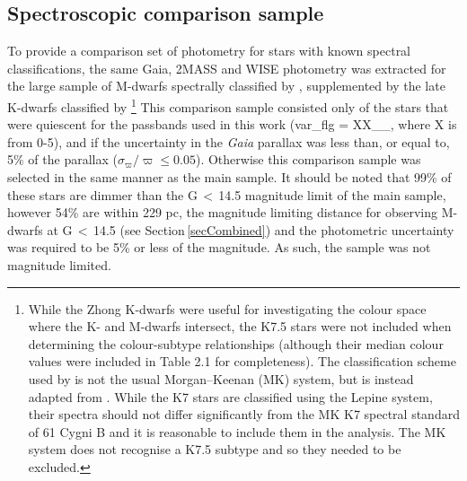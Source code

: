 \subsection{Spectroscopic comparison sample}
\label{secSpecData}
To provide a comparison set of photometry for stars with known spectral classifications, the same Gaia, 2MASS and WISE photometry was extracted for the large sample of M-dwarfs spectrally classified by \cite{2011West}, supplemented by the late K-dwarfs classified by \cite{2015Zhong}\footnote{While the Zhong K-dwarfs were useful for investigating the colour space where the K- and M-dwarfs intersect, the K7.5 stars were not included when determining the colour-subtype relationships (although their median colour values were included in Table 2.1 for completeness). The classification scheme used by \citealt{2015Zhong} is not the usual  Morgan–Keenan (MK) system, but is instead adapted from \citealt{2003Lepine}. While the K7 stars are classified using the Lepine system, their spectra should not differ significantly from the MK K7 spectral standard of 61 Cygni B and it is reasonable to include them in the analysis. The MK system does not recognise a K7.5 subtype and so they needed to be excluded.} This comparison sample consisted only of the stars that were quiescent for the passbands used in this work (var\_flg = XX\_\_, where X is from 0-5), and if the uncertainty in the {\em Gaia} parallax was less than, or equal to, 5\% of the parallax ($\sigma_\varpi/\varpi \leq 0.05$). Otherwise this comparison sample was selected in the same manner as the main sample. It should be noted that 99\% of these stars are dimmer than the G\,$<$\,14.5 magnitude limit of the main sample, however 54\% are within 229 pc, the magnitude limiting distance for observing M-dwarfs at G\,$<$\,14.5 (see Section\,\ref{secCombined}) and the photometric uncertainty was required to be 5\% or less of the magnitude. As such, the sample was not magnitude limited.\\

